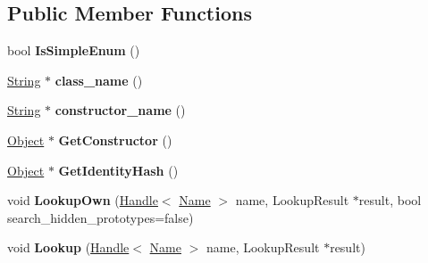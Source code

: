 \subsection*{Public Member Functions}
\begin{DoxyCompactItemize}
\item 
\hypertarget{classv8_1_1internal_1_1_j_s_receiver_a95f442910d5481782a70dcefefbae8b9}{}bool {\bfseries Is\+Simple\+Enum} ()\label{classv8_1_1internal_1_1_j_s_receiver_a95f442910d5481782a70dcefefbae8b9}

\item 
\hypertarget{classv8_1_1internal_1_1_j_s_receiver_a6a4858fbbc8e6daab429fc59c8b8d9a6}{}\hyperlink{classv8_1_1internal_1_1_string}{String} $\ast$ {\bfseries class\+\_\+name} ()\label{classv8_1_1internal_1_1_j_s_receiver_a6a4858fbbc8e6daab429fc59c8b8d9a6}

\item 
\hypertarget{classv8_1_1internal_1_1_j_s_receiver_a75022c49731d857f5d0fd1d47e782b56}{}\hyperlink{classv8_1_1internal_1_1_string}{String} $\ast$ {\bfseries constructor\+\_\+name} ()\label{classv8_1_1internal_1_1_j_s_receiver_a75022c49731d857f5d0fd1d47e782b56}

\item 
\hypertarget{classv8_1_1internal_1_1_j_s_receiver_a27b463a2e6ac5ec6574ab4e7efac54fa}{}\hyperlink{classv8_1_1internal_1_1_object}{Object} $\ast$ {\bfseries Get\+Constructor} ()\label{classv8_1_1internal_1_1_j_s_receiver_a27b463a2e6ac5ec6574ab4e7efac54fa}

\item 
\hypertarget{classv8_1_1internal_1_1_j_s_receiver_ae65c6c28654563cf475200b1a4bc0254}{}\hyperlink{classv8_1_1internal_1_1_object}{Object} $\ast$ {\bfseries Get\+Identity\+Hash} ()\label{classv8_1_1internal_1_1_j_s_receiver_ae65c6c28654563cf475200b1a4bc0254}

\item 
\hypertarget{classv8_1_1internal_1_1_j_s_receiver_a125fcc0339f15305af0b3acaae4f7040}{}void {\bfseries Lookup\+Own} (\hyperlink{classv8_1_1internal_1_1_handle}{Handle}$<$ \hyperlink{classv8_1_1internal_1_1_name}{Name} $>$ name, Lookup\+Result $\ast$result, bool search\+\_\+hidden\+\_\+prototypes=false)\label{classv8_1_1internal_1_1_j_s_receiver_a125fcc0339f15305af0b3acaae4f7040}

\item 
\hypertarget{classv8_1_1internal_1_1_j_s_receiver_af751e8be8434c8a30f18e53480e52a37}{}void {\bfseries Lookup} (\hyperlink{classv8_1_1internal_1_1_handle}{Handle}$<$ \hyperlink{classv8_1_1internal_1_1_name}{Name} $>$ name, Lookup\+Result $\ast$result)\label{classv8_1_1internal_1_1_j_s_receiver_af751e8be8434c8a30f18e53480e52a37}

\end{DoxyCompactItemize}
